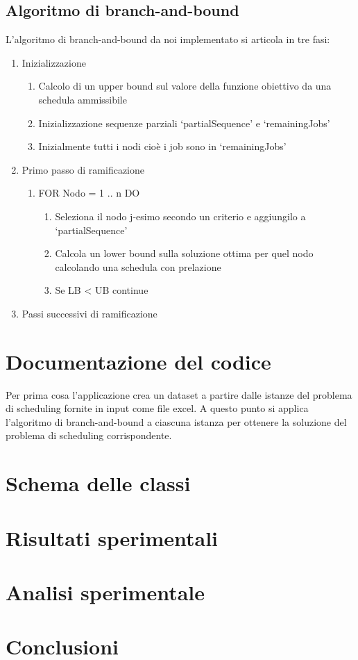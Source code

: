 \documentclass[12pt,a4paper]{report}
\begin{document}
\subsection{Algoritmo di branch-and-bound}
\newpage
L'algoritmo di branch-and-bound da noi implementato si articola in tre fasi:
\begin{enumerate}
	\item Inizializzazione
	\begin{enumerate}
		\item Calcolo di un upper bound sul valore della funzione obiettivo da una schedula ammissibile
		\item Inizializzazione sequenze parziali ‘partialSequence’ e ‘remainingJobs’
		\item Inizialmente tutti i nodi cioè i job sono in ‘remainingJobs’
	\end{enumerate}
	\item Primo passo di ramificazione
	\begin{enumerate}
		\item FOR Nodo = 1 .. n DO
		\begin{enumerate}
			\item Seleziona il nodo j-esimo secondo un criterio e aggiungilo a ‘partialSequence’
			\item Calcola un lower bound sulla soluzione ottima per quel nodo calcolando una schedula con prelazione
			\item Se LB < UB continue
		\end{enumerate}
	\end{enumerate}
	\item Passi successivi di ramificazione
	
\end{enumerate}

\section{Documentazione del codice}
	Per prima cosa l'applicazione crea un dataset a partire dalle istanze del problema di scheduling fornite in input come file excel. A questo punto si applica l'algoritmo di branch-and-bound a ciascuna istanza per ottenere la soluzione del problema di scheduling corrispondente.
\section{Schema delle classi}
\section{Risultati sperimentali}
\section{Analisi sperimentale}
\section{Conclusioni}
\end{document}
